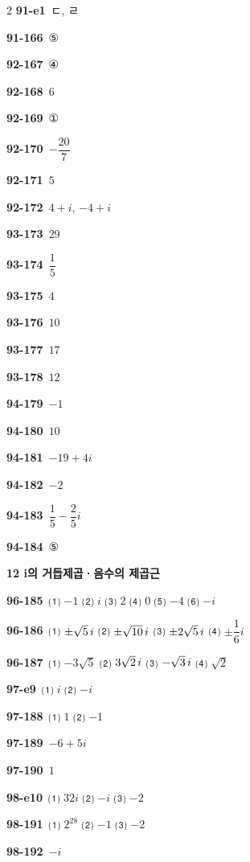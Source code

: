 \documentclass[10pt,a4paper]{article}
\begin{document}
\begin{multicols}{2}
\noindent\textbf{91-e1}\ ㄷ, ㄹ\par
\noindent\textbf{91-166}\ ⑤\par
\noindent\textbf{92-167}\ ④\par
\noindent\textbf{92-168}\ $6$\par
\noindent\textbf{92-169}\ ①\par
\noindent\textbf{92-170}\ $-\dfrac{20}{7}$\par
\noindent\textbf{92-171}\ $5$\par
\noindent\textbf{92-172}\ $4+i$, $-4+i$\par
\noindent\textbf{93-173}\ $29$\par
\noindent\textbf{93-174}\ $\dfrac{1}{5}$\par
\noindent\textbf{93-175}\ $4$\par
\noindent\textbf{93-176}\ $10$\par
\noindent\textbf{93-177}\ $17$\par
\noindent\textbf{93-178}\ $12$\par
\noindent\textbf{94-179}\ $-1$\par
\noindent\textbf{94-180}\ $10$\par
\noindent\textbf{94-181}\ $-19+4i$\par
\noindent\textbf{94-182}\ $-2$\par
\noindent\textbf{94-183}\ $\dfrac{1}{5}-\dfrac{2}{5}i$\par
\noindent\textbf{94-184}\ ⑤\par
\noindent\textbf{12 i의 거듭제곱·음수의 제곱근}\par\smallskip
\noindent\textbf{96-185}\ ⑴ $-1$ ⑵ $i$ ⑶ $2$ ⑷ $0$ ⑸ $-4$ ⑹ $-i$\par
\noindent\textbf{96-186}\ ⑴ $\pm\sqrt{5}\mkern3mu i$ ⑵ $\pm\sqrt{10}\mkern3mu i$ ⑶ $\pm 2\sqrt{5}\mkern3mu i$ ⑷ $\pm\dfrac{1}{6}i$\par
\noindent\textbf{96-187}\ ⑴ $-3\sqrt{5}$ ⑵ $3\sqrt{2}\mkern3mu i$ ⑶ $-\sqrt{3}\mkern3mu i$ ⑷ $\sqrt{2}$\par
\noindent\textbf{97-e9}\ ⑴ $i$ ⑵ $-i$\par
\noindent\textbf{97-188}\ ⑴ $1$ ⑵ $-1$\par
\noindent\textbf{97-189}\ $-6+5i$\par
\noindent\textbf{97-190}\ $1$\par
\noindent\textbf{98-e10}\ ⑴ $32i$ ⑵ $-i$ ⑶ $-2$\par
\noindent\textbf{98-191}\ ⑴ $2^{28}$ ⑵ $-1$ ⑶ $-2$\par
\noindent\textbf{98-192}\ $-i$\par

\end{multicols}
\end{document}

